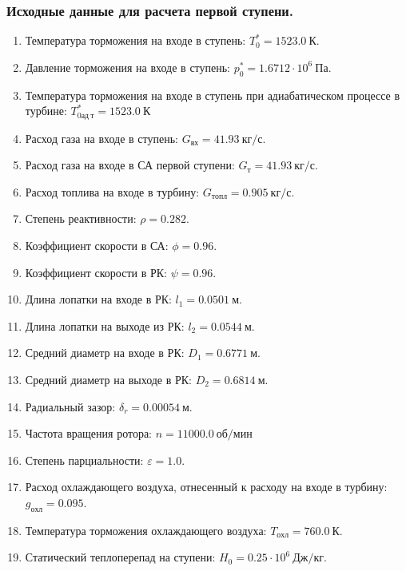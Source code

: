 \documentclass[a4paper,12pt]{article}
\begin{document}
    \subsubsection{Исходные данные для расчета первой ступени.}
%    
    \begin{enumerate}

        \item Температура торможения на входе в ступень: $T_0^* = 1523.0\ К $.
        \item Давление торможения на входе в ступень: $p_0^* = 1.6712 \cdot 10^6 \ Па$.
        \item Температура торможения на входе в ступень при адиабатическом процессе в турбине: $T_{0ад\ т}^* = 1523.0\ К$
        \item Расход газа на входе в ступень: $G_{вх} = 41.93\ кг/с$.
        \item Расход газа на входе в СА первой ступени: $ G_т = 41.93\ кг/с $.
        \item Расход топлива на входе в турбину: $ G_{топл} = 0.905\ кг/с $.
        \item Степень реактивности: $ \rho = 0.282 $.
        \item Коэффициент скорости в СА: $ \phi = 0.96 $.
        \item Коэффициент скорости в РК: $ \psi = 0.96 $.
        \item Длина лопатки на входе в РК: $ l_1 = 0.0501\ м $.
        \item Длина лопатки на выходе из РК: $ l_2 = 0.0544\ м $.
        \item Средний диаметр на входе в РК: $ D_1 = 0.6771\ м $.
        \item Средний диаметр на выходе в РК: $ D_2 = 0.6814\ м $.
        \item Радиальный зазор: $ \delta_r = 0.00054\ м $.
        \item Частота вращения ротора: $ n = 11000.0\ об/мин $
        \item Степень парциальности: $ \varepsilon = 1.0 $.
        \item Расход охлаждающего воздуха, отнесенный к расходу на входе в турбину: $ g_{охл} = 0.095 $.
        \item Температура торможения охлаждающего воздуха: $ T_{охл} = 760.0\ К $.

        
        \item Статический теплоперепад на ступени: $ H_0 = 0.25 \cdot 10^6 \ Дж/кг $.

        

    \end{enumerate}
    
\end{document}
